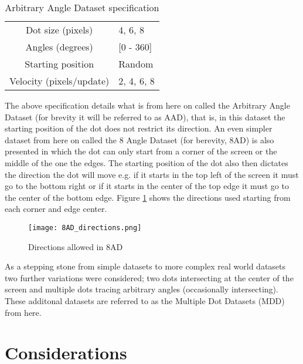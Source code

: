 \begin{table}[h]
\centering
\begin{tabular}{ | c | l | }
    \hline
    Dot size (pixels) & 4, 6, 8 \\
    Angles (degrees) & [0 - 360] \\
    Starting position & Random \\
    Velocity (pixels/update) & 2, 4, 6, 8 \\
    \hline
\end{tabular}
\caption{Arbitrary Angle Dataset specification}
\label{tb:datasetspecs}
\end{table}

The above specification details what is from here on called the Arbitrary Angle Dataset (for brevity it will be referred to as AAD), that is, in this dataset the starting position of the dot does not restrict its direction.
An even simpler dataset from here on called the 8 Angle Dataset (for berevity, 8AD) is also presented in which the dot can only start from a corner of the screen or the middle of the one the edges.
The starting position of the dot also then dictates the direction the dot will move e.g. if it starts in the top left of the screen it must go to the bottom right or if it starts in the center of the top edge it must go to the center of the bottom edge.
Figure \ref{fig:8ADDirections} shows the directions used starting from each corner and edge center.

\begin{figure}
    \centering
    \texttt{[image: 8AD\_directions.png]}
    \caption{Directions allowed in 8AD}
    \label{fig:8ADDirections}
\end{figure}

As a stepping stone from simple datasets to more complex real world datasets two further variations were considered; two dots intersecting at the center of the screen and multiple dots tracing arbitrary angles (occasionally intersecting).
These additonal datasets are referred to as the Multiple Dot Datasets (MDD) from here. 





\section{Considerations}
